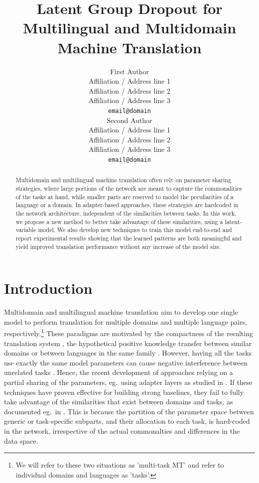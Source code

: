 \documentclass[11pt]{article}
\title{Latent Group Dropout for Multilingual and Multidomain Machine Translation}
\author{First Author \\
  Affiliation / Address line 1 \\
  Affiliation / Address line 2 \\
  Affiliation / Address line 3 \\
  \texttt{email@domain} \\\And
  Second Author \\
  Affiliation / Address line 1 \\
  Affiliation / Address line 2 \\
  Affiliation / Address line 3 \\
  \texttt{email@domain} \\}
\begin{document}
\setlength{\abovedisplayskip}{3pt}
\setlength{\belowdisplayskip}{3pt}
\maketitle

\begin{abstract}
  Multidomain and multilingual machine translation often rely on parameter sharing strategies, where large portions of the network are meant to capture the commonalities of the tasks at hand, while smaller parts are reserved to model the peculiarities of a language or a domain. In adapter-based approaches, these strategies are hardcoded in the network architecture, independent of the similarities between tasks. In this work, we propose a new method to better take advantage of these similarities, using a latent-variable model. We also develop new techniques to train this model end-to-end and report experimental results showing that the learned patterns are both meaningful and yield improved translation performance without any increase of the model size. 
\end{abstract}

\section{Introduction}
Multidomain and multilingual machine translation aim to develop one single model to perform translation for multiple domains and multiple language pairs, respectively.\footnote{We will refer to these two situations as 'multi-task MT' and refer to individual domains and languages as 'tasks'.} These paradigms are motivated by the compactness of the resulting translation system \citep{Chu18multilingual,dabre20survey}, the hypothetical positive knowledge transfer between similar domains \citep{Pham21revisiting} or between languages in the same family \citep{Tan19multilingual}. However, having all the tasks use exactly the same model parameters can cause negative interference between unrelated tasks \citep{conneau20unsupervised,wang20negative}. Hence, the recent development of approaches relying on a partial sharing of the parameters, eg.\ using adapter layers as studied in \citep{houlsby19parameter,Bapna19simple,Pham20Study,Philip20monolingual}. If these techniques have proven effective for building strong baselines, they fail to fully take advantage of the similarities that exist between domains and tasks, as documented eg.\ in \citep{Pham21revisiting}. This is because the partition of the parameter space between generic or task-specific subparts, and their allocation to each task, is hard-coded in the network, irrespective of the actual commonalties and differences in the data space.
\end{document}
